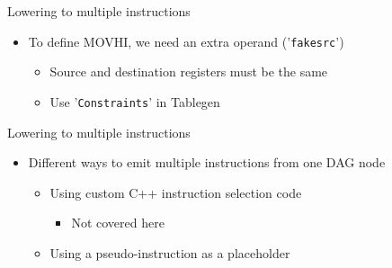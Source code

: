 
\begin{frame}[fragile]{Lowering to multiple instructions}

\begin{itemize}
    \item To define MOVHI, we need an extra operand ('\texttt{fakesrc}')
    \begin{itemize}
        \item Source and destination registers must be the same
        \item Use '\texttt{Constraints}' in Tablegen
    \end{itemize}
\end{itemize}


\end{frame}


\begin{frame}{Lowering to multiple instructions}

\begin{itemize}
    \item Different ways to emit multiple instructions from one DAG node
    \begin{itemize}
        \item Using custom C++ instruction selection code
            \begin{itemize}
                \item Not covered here
            \end{itemize}
        \item Using a pseudo-instruction as a placeholder
    \end{itemize}
\end{itemize}

\end{frame}


